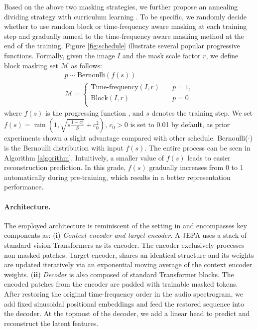 \documentclass{article}
\begin{document}
Based on the above two masking strategies, we further propose an annealing dividing strategy with curriculum learning \cite{bengio2009curriculum,hacohen2019power,fei2021partially}. 
To be specific, we randomly decide whether to use random block or time-frequency aware masking at each training step and gradually anneal to the time-frequency aware masking method at the end of the training.
Figure \ref{fig:schedule} illustrate several popular progressive functions. 
Formally, given the image $I$ and the mask scale factor $r$,
we define block masking set $\mathcal{M}$ as follows: 
\begin{align} 
    p \sim  \text{Bernoulli}(f(s)) \\ 
\mathcal{M} =
\begin{cases}
\text{Time-frequency}(I, r) &\quad p= 1,\\
\text{Block}(I, r) &\quad p=0 \\
\end{cases}
\end{align} 
where $f(s)$ is the progressing function \cite{platanios2019competence}, and $s$ denotes the training step. We set $f(s) = \min (1, \sqrt{s \frac{1 - c_0^2}{S}} + c_0^2)$,
$c_0 > 0$ is set to 0.01 by default, as prior experiments shown a slight advantage compared with other schedule. 
Bernoulli($\cdot$) is the Bernoulli distribution with input
$f(s)$. 
The entire process can be seen in Algorithm \ref{algorithm}. 
Intuitively, a smaller value of $f(s)$ leads to easier reconstruction prediction. In this grade, $f(s)$ gradually increases from 0 to 1 automatically during pre-training, which results in a better representation performance. 


\paragraph{Architecture.}
The employed architecture is reminiscent of the setting in \cite{huang2022masked,mae,assran2023self} and encompasses key components as: 
($\textbf{i}$) \emph{Context-encoder and target-encoder.} 
A-JEPA uses a stack of standard vision Transformers \cite{dosovitskiy2020image} as its encoder. 
The encoder exclusively processes non-masked patches. 
Target encoder, shares an identical structure and its weights are updated iteratively via an exponential moving average of the context encoder weights.
($\textbf{ii}$) \emph{Decoder} is also composed of standard Transformer blocks. The encoded patches from the encoder are padded with trainable masked tokens. After restoring the original time-frequency order in the audio spectrogram, we add fixed sinusoidal positional embeddings and feed the restored sequence into the decoder. At the topmost of the decoder, we add a linear head to predict and reconstruct the latent features.
\end{document}
